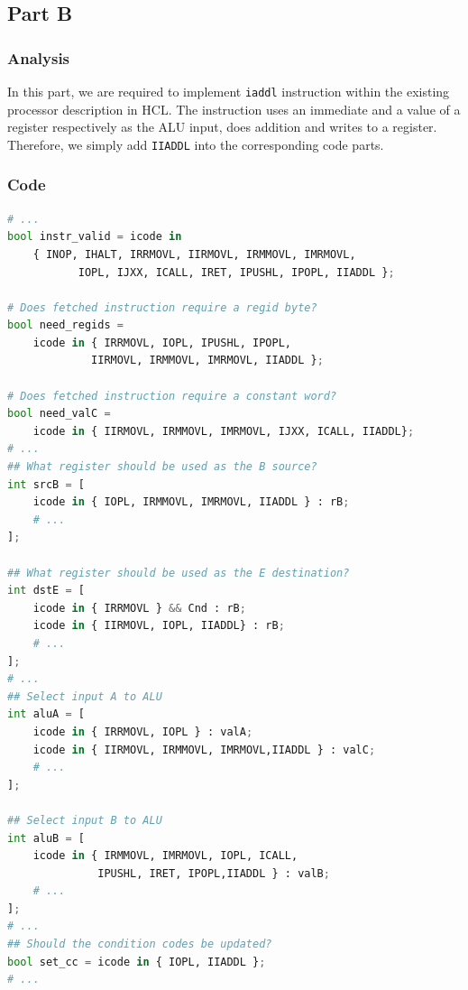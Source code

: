 \documentclass{article}
\begin{document}
\subsection{Part B}

\subsubsection{Analysis}
\hspace{1 em

}
\par In this part, we are required to implement \lstinline{iaddl} instruction within the existing processor description in HCL. The instruction uses an immediate and a value of a register respectively as the ALU input, does addition and writes to a register. Therefore, we simply add \lstinline{IIADDL} into the corresponding code parts. 
\subsubsection{Code}

\begin{lstlisting}[language=python]
# ...
bool instr_valid = icode in 
	{ INOP, IHALT, IRRMOVL, IIRMOVL, IRMMOVL, IMRMOVL,
	       IOPL, IJXX, ICALL, IRET, IPUSHL, IPOPL, IIADDL };

# Does fetched instruction require a regid byte?
bool need_regids =
	icode in { IRRMOVL, IOPL, IPUSHL, IPOPL, 
		     IIRMOVL, IRMMOVL, IMRMOVL, IIADDL };

# Does fetched instruction require a constant word?
bool need_valC =
	icode in { IIRMOVL, IRMMOVL, IMRMOVL, IJXX, ICALL, IIADDL};
# ...
## What register should be used as the B source?
int srcB = [
	icode in { IOPL, IRMMOVL, IMRMOVL, IIADDL } : rB;
	# ...
];

## What register should be used as the E destination?
int dstE = [
	icode in { IRRMOVL } && Cnd : rB;
	icode in { IIRMOVL, IOPL, IIADDL} : rB;
	# ...
];
# ...
## Select input A to ALU
int aluA = [
	icode in { IRRMOVL, IOPL } : valA;
	icode in { IIRMOVL, IRMMOVL, IMRMOVL,IIADDL } : valC;
	# ...
];

## Select input B to ALU
int aluB = [
	icode in { IRMMOVL, IMRMOVL, IOPL, ICALL, 
		      IPUSHL, IRET, IPOPL,IIADDL } : valB;
	# ...
];
# ...
## Should the condition codes be updated?
bool set_cc = icode in { IOPL, IIADDL };
# ...
\end{lstlisting}
\end{document}
